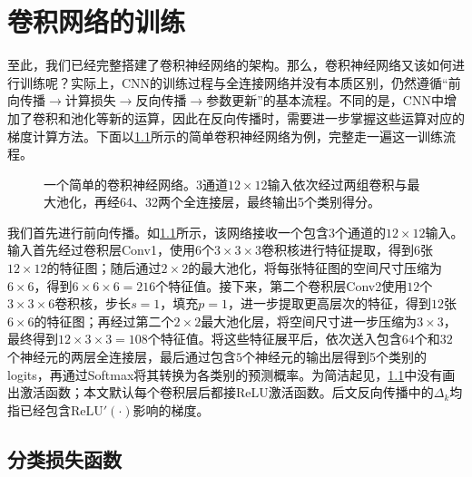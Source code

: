 
\chapter{卷积网络的训练}

至此，我们已经完整搭建了卷积神经网络的架构。那么，卷积神经网络又该如何进行训练呢？实际上，CNN的训练过程与全连接网络并没有本质区别，仍然遵循“前向传播$\rightarrow$计算损失$\rightarrow$反向传播$\rightarrow$参数更新”的基本流程。不同的是，CNN中增加了卷积和池化等新的运算，因此在反向传播时，需要进一步掌握这些运算对应的梯度计算方法。下面以\cref{fig:cnn}所示的简单卷积神经网络为例，完整走一遍这一训练流程。

\begin{figure}[H]
    \caption{一个简单的卷积神经网络。3通道$12\times 12$输入依次经过两组卷积与最大池化，再经64、32两个全连接层，最终输出5个类别得分。}
    \label{fig:cnn}
\end{figure}

我们首先进行前向传播。如\cref{fig:cnn}所示，该网络接收一个包含$3$个通道的$12\times12$输入。输入首先经过卷积层Conv1，使用$6$个$3\times3\times3$卷积核进行特征提取，得到$6$张$12\times12$的特征图；随后通过$2\times2$的最大池化，将每张特征图的空间尺寸压缩为$6\times6$，得到$6\times6\times6=216$个特征值。接下来，第二个卷积层Conv2使用$12$个$3\times3\times6$卷积核，步长$s=1$，填充$p=1$，进一步提取更高层次的特征，得到$12$张$6\times6$的特征图；再经过第二个$2\times2$最大池化层，将空间尺寸进一步压缩为$3\times3$，最终得到$12\times3\times3=108$个特征值。将这些特征展平后，依次送入包含$64$个和$32$个神经元的两层全连接层，最后通过包含$5$个神经元的输出层得到5个类别的logits，再通过Softmax将其转换为各类别的预测概率。为简洁起见，\cref{fig:cnn}中没有画出激活函数；本文默认每个卷积层后都接ReLU激活函数。后文反向传播中的$\Delta_k$均指已经包含$\mathrm{ReLU}'(\cdot)$影响的梯度。

\section{分类损失函数}

